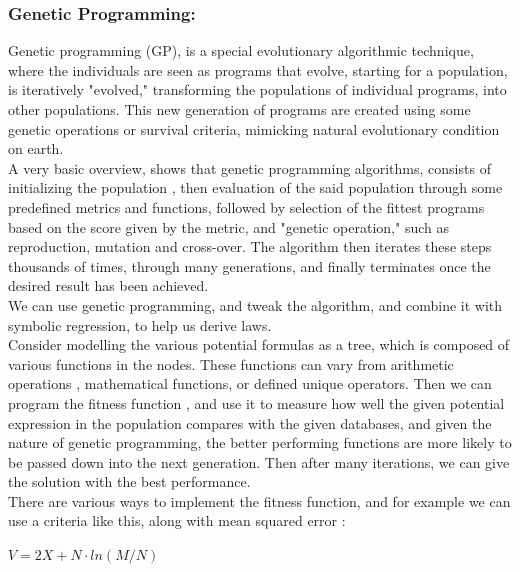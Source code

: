 \documentclass{article}
\begin{document}
\subsubsection{Genetic Programming:}



Genetic programming (GP), is a special evolutionary algorithmic technique, where the individuals are seen as programs that evolve, starting for a population, is iteratively "evolved," transforming the populations of individual programs, into other populations. This new generation of programs are created using some genetic operations or survival criteria, \cite{lacava2021}mimicking natural evolutionary condition on earth.\\ 

A very basic overview, shows that genetic programming algorithms, consists of initializing the population \cite{abroshan2023}, then evaluation of the said population through some predefined metrics and functions, followed by selection of the fittest programs based on the score given by the metric, and "genetic operation," such as reproduction, mutation and cross-over. The algorithm then iterates these steps thousands of times, through many generations, and finally terminates once the desired result has been achieved.\\

We can use genetic programming, and tweak the algorithm, and combine it with symbolic regression, to help us derive laws. \\

Consider modelling the various potential formulas as a tree, which is composed of various functions in the nodes. These functions can vary from arithmetic operations  , mathematical functions, or defined unique operators. Then we can program the fitness function \cite{Angeline1994}, and use it to measure how well the given potential expression in the population compares with the given databases, and given the nature of genetic programming, the better performing functions are more likely to be passed down into the next generation. Then after many iterations, we can give the solution with the best performance. \\ 

There are various ways to implement the fitness function, and for example we can use a criteria like this, along with mean squared error \cite{Liddle2009}:\\

\begin{center}
  $V = 2X + N \cdot ln(M/N) $
\end{center}
\end{document}
